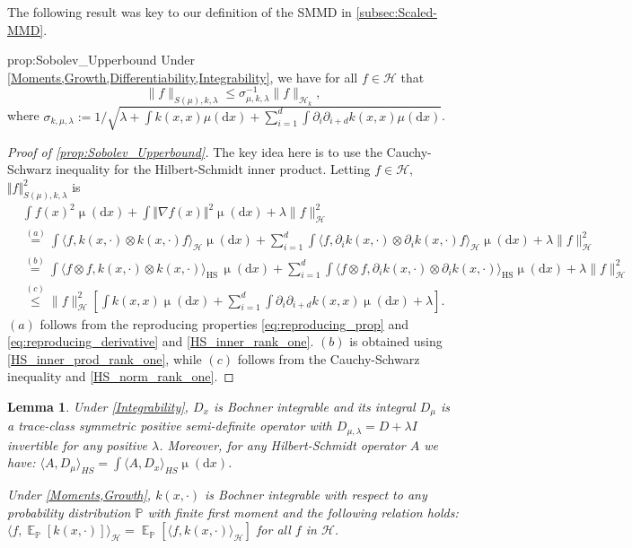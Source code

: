 \documentclass{article}
\newcommand{\ud}{\mathrm d}
\newcommand{\dx}{\ud x}
\newcommand{\mudx}{\operatorname{\mu}(\dx)}
\DeclareMathOperator{\E}{\mathbb E}
\newcommand{\h}{\mathcal H}
\newcommand{\hs}{\mathrm{HS}}
\newcommand{\PP}{\mathbb P}
\newtheorem{lem}{Lemma}
\begin{document}
The following result was key to our definition of the SMMD in \cref{subsec:Scaled-MMD}.
\begin{repprop}{prop:Sobolev_Upperbound}
  Under \cref{Moments,Growth,Differentiability,Integrability},
  we have for all $f \in \h$ that
  \[
    \lVert f \rVert_{S(\mu),k,\lambda}
    \le \sigma_{\mu,k,\lambda}^{-1} \lVert f \rVert_{\h_k}
,\]
  where
  $\sigma_{k,\mu,\lambda} := 1 / \sqrt{
    \lambda + \int k(x, x) \mu(\ud x) + \sum_{i=1}^d \int \partial_i \partial_{i+d} k(x, x) \mu(\ud x)
  }$.
\end{repprop}
\begin{proof}[Proof of \cref{prop:Sobolev_Upperbound}]
\label{proof:Sobolev_Upperbound}
The key idea here is to use the Cauchy-Schwarz inequality for the Hilbert-Schmidt inner product.
Letting $f \in \h$,
$\Vert f\Vert_{S(\mu),k,\lambda}^{2}$ is
\begin{align*}
&  \int f(x)^{2}\mudx
   + \int\Vert\nabla f(x)\Vert^{2}\mudx
   + \lambda \lVert f \rVert_{\h}^{2}
  \\
  &\stackrel{(a)}{=}
    \int\langle f, k(x, \cdot)\otimes k(x, \cdot) f \rangle_{\h} \mudx
  + \sum_{i=1}^{d} \int \langle f, \partial_{i} k(x, \cdot)\otimes\partial_{i}k(x, \cdot) f \rangle_{\h} \mudx
  + \lambda \lVert f \rVert_{\h}^{2}
  \nonumber \\
  &\stackrel{(b)}{=}
    \int\langle f\otimes f,k(x, \cdot)\otimes k(x, \cdot)\rangle_\hs \,\mudx
  + \sum_{i=1}^d \int \langle f\otimes f, \partial_i k(x, \cdot) \otimes \partial_i k(x, \cdot)\rangle_\hs \mudx
  + \lambda \lVert f \rVert_{\h}^{2}
  \nonumber \\
  &\stackrel{(c)}{\leq}
    \lVert f \rVert_{\h}^{2}\left[
      \int k(x,x) \mudx
      + \sum_{i=1}^d \int \partial_i \partial_{i+d} k(x, x) \mudx
      + \lambda
    \right]
  \nonumber
.\end{align*}
$(a)$ follows from the reproducing properties \eqref{eq:reproducing_prop}
and \eqref{eq:reproducing_derivative} and \cref{HS_inner_rank_one}.
$(b)$ is obtained using \cref{HS_inner_prod_rank_one},
while $(c)$ follows from the Cauchy-Schwarz inequality and \cref{HS_norm_rank_one}.
\end{proof}
\begin{lem}
\label{lem:Bochner_interversion}Under \cref{Integrability}, $D_{x}$
is Bochner integrable and its integral $D_\mu$ is a trace-class symmetric
positive semi-definite operator with $D_{\mu,\lambda}=D+\lambda I$ invertible
for any positive $\lambda$. Moreover, for any Hilbert-Schmidt operator
$A$ we have: $\langle A,D_\mu \rangle_{HS}=\int\langle A,D_{x}\rangle_{HS}\mudx$.

Under \cref{Moments,Growth}, $k(x, \cdot)$ is Bochner integrable with
respect to any probability distribution $\PP$ with finite first moment
and the following relation holds:
$\langle f,\E_{\PP}\left[k(x, \cdot)\right]\rangle_{\h} = \E_{\PP}\left[\langle f,k(x, \cdot)\rangle_{\h}\right]$
for all $f$ in $\h$.
\end{lem}
\end{document}

